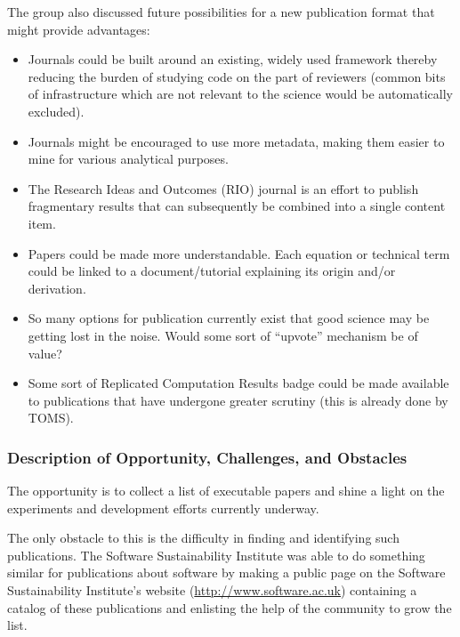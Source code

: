 The group also discussed future possibilities for a new publication format
that might provide advantages:
\begin{itemize}

\item Journals could be built around an existing, widely used framework thereby
reducing the burden of studying code on the part of reviewers (common bits of
infrastructure which are not relevant to the science would be automatically
excluded).

\item Journals might be encouraged to use more metadata, making them easier to
mine for various analytical purposes.

\item The Research Ideas and Outcomes (RIO) journal is an effort to publish
fragmentary results that can subsequently be combined into a single content
item.

\item Papers could be made more understandable. Each equation or technical term
could be linked to a document/tutorial explaining its origin and/or
derivation.

\item So many options for publication currently exist that good science may be
getting lost in the noise. Would some sort of ``upvote'' mechanism be of value?

\item Some sort of Replicated Computation Results badge could be made available
to publications that have undergone greater scrutiny (this is already done by
TOMS).
  
\end{itemize}

\subsubsection{Description of Opportunity, Challenges, and Obstacles}

The opportunity is to collect a list of executable papers and shine a
light on the experiments and development efforts currently underway.

The only obstacle to this is the difficulty in finding and identifying such
publications. The Software Sustainability Institute was able to do something
similar for publications about software by making a public page on the Software
Sustainability Institute's website (\url{http://www.software.ac.uk}) containing a
catalog of these publications and enlisting the help of the community to grow
the list. 


